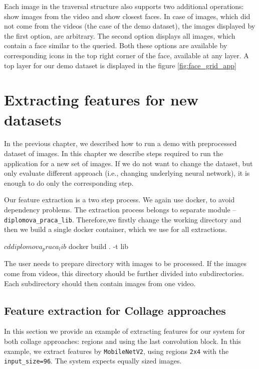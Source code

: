 Each image in the traversal structure also supports two additional operations: show images from the video and show closest faces. In case of images, which did not come from the videos (the case of the demo dataset), the images displayed by the first option, are arbitrary. The second option displays all images, which contain a face similar to the queried. Both these options are available by corresponding icons in the top right corner of the face, available at any layer. A top layer for our demo dataset is displayed in the figure \ref{fig:face_grid_app}


\chapter{Extracting features for new datasets}
\label{ch:custom_dataset}

In the previous chapter, we described how to run a demo with preprocessed dataset of images. In this chapter we describe steps required to run the application for a new set of images. If we do not want to change the dataset, but only evaluate different approach (i.e., changing underlying neural network), it is enough to do only the corresponding step.

Our feature extraction is a two step process. We again use docker, to avoid dependency problems. The extraction process belongs to separate module -- \verb+diplomova_praca_lib+. Therefore,we  firstly change the working directory and then we build a single docker container, which we use for all extractions.

\vspace{0.5cm}
\begin{boxedverbatim}
$ cd diplomova_praca_lib
$ docker build . -t lib
\end{boxedverbatim}
\vspace{0.5cm}

The user needs to prepare directory with images to be processed. If the images come from videos, this directory should be further divided into subdirectories. Each subdirectory should then contain images from one video.

\section{Feature extraction for Collage approaches}

In this section we provide an example of extracting features for our system for both collage approaches: regions and using the last convolution block. In this example, we extract features by \verb+MobileNetV2+, using regions \verb+2x4+ with the \verb+input_size=96+. The system expects equally sized images.

